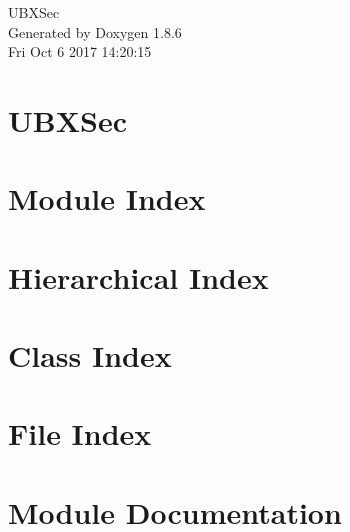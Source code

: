 \documentclass[twoside]{book}
\newcommand{\clearemptydoublepage}{%
  \newpage{\pagestyle{empty}\cleardoublepage}%
}
\begin{document}
\hypersetup{pageanchor=false}
\begin{titlepage}
\vspace*{7cm}
\begin{center}%
{\Large U\-B\-X\-Sec }\\
\vspace*{1cm}
{\large Generated by Doxygen 1.8.6}\\
\vspace*{0.5cm}
{\small Fri Oct 6 2017 14:20:15}\\
\end{center}
\end{titlepage}
\clearemptydoublepage
\tableofcontents
\clearemptydoublepage
{}
\hypersetup{pageanchor=true}

\chapter{U\-B\-X\-Sec}
\label{md__home_travis_build_marcodeltutto_UBXSec_README}
\hypertarget{md__home_travis_build_marcodeltutto_UBXSec_README}{}

\chapter{Module Index}

\chapter{Hierarchical Index}

\chapter{Class Index}

\chapter{File Index}

\chapter{Module Documentation}


\end{document}
